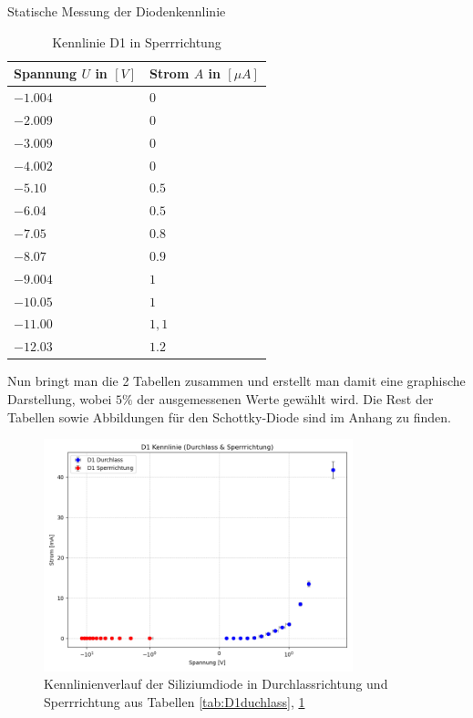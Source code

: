 \documentclass{article}
\theoremstyle{definition}
\begin{document}
\begin{aufgabe}{Statische Messung der Diodenkennlinie}
    \newpage

    \begin{table}[h!]
    \centering
    \begin{tabular}{|l|l|}
    \hline
    \textbf{Spannung $U$ in $[V]$} & \textbf{Strom $A$ in $[\mu A]$} \\
    \hline
    $-1.004$ & $0$ \\
    $-2.009$ & $0$\\
    $-3.009$ & $0$\\
    $-4.002$ & $0$\\
    $-5.10$ & $0.5$\\
    $-6.04$ & $0.5$\\
    $-7.05$ & $0.8$\\
    $-8.07$ & $0.9$\\
    $-9.004$ & $1$\\
    $-10.05$ & $1$\\
    $-11.00$ & $1,1$\\
    $-12.03$ & $1.2$\\
    \hline
    \end{tabular}
    \caption{Kennlinie D1 in Sperrrichtung}
    \label{tab:D1sperr}
    \end{table}

    Nun bringt man die 2 Tabellen zusammen und erstellt man damit eine graphische Darstellung, wobei $5\%$ der ausgemessenen Werte
    gewählt wird. Die Rest der Tabellen sowie Abbildungen für den Schottky-Diode
     sind im Anhang zu finden. 
     \begin{figure}[H]
        \centering
        \includegraphics[width=0.8\textwidth]{figs/dioden_d1_combined.png}
        \caption{Kennlinienverlauf der Siliziumdiode in Durchlassrichtung und Sperrrichtung aus Tabellen \ref{tab:D1duchlass}, \ref{tab:D1sperr} }
        \label{dioden_d1_combined}
    \end{figure}


\end{aufgabe}
\end{document}
